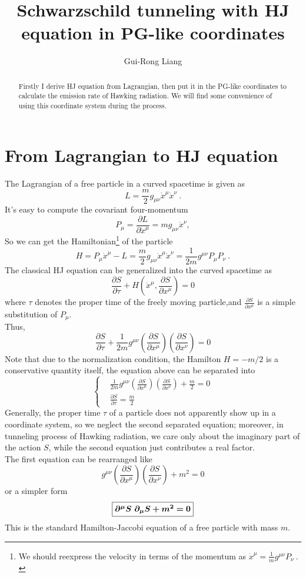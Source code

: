 \documentclass{article}
\newcommand{\be}{\begin{equation}}
\newcommand{\ee}{\end{equation}}
\begin{document}
\title{Schwarzschild tunneling with HJ equation in PG-like coordinates}
\author{Gui-Rong Liang}
\maketitle
\begin{abstract}
Firstly I derive HJ equation from Lagrangian, then put it in the PG-like coordinates to calculate the emission rate of Hawking radiation. We will find some convenience of using this coordinate system during the process.
\end{abstract}
\section{From Lagrangian to HJ equation}
The Lagrangian of a free particle in a curved spacetime is given as
\be
L=\frac m 2 g_{\mu\nu}\dot{x}^\mu\dot{x}^\nu ~.
\ee
It's easy to compute the covariant four-momentum
\be
P_\mu=\frac{\partial L}{\partial \dot x^\mu}=m g_{\mu\nu}\dot x^\nu,
\ee
\renewcommand{\thefootnote}{\fnsymbol{footnote}}
So we can get the Hamiltonian\footnote{We should reexpress the velocity in terms of the momentum as $\dot x^\mu=\frac 1 m g^{\mu\nu}P_\nu ~.$} of the particle
\be
H=P_\mu \dot x^\mu-L=\frac m 2 g_{\mu\nu}\dot x^\mu \dot x^\nu=\frac1{2m} g^{\mu\nu}P_\mu P_\nu ~.
\ee
The classical HJ equation can be generalized into the curved spacetime as
\be
\frac{\partial S}{\partial \tau}+H(\dot x^\mu,\frac{\partial S}{\partial x^\mu})=0
\ee
where $\tau$ denotes the proper time of the freely moving particle,and $\frac{\partial S}{\partial x^\mu}$ is a simple substitution of $P_\mu$.\\
Thus,
\be
\frac{\partial S}{\partial\tau}+\frac1{2m}g^{\mu\nu} (\frac{\partial S}{\partial x^\mu}) (\frac{\partial S} {\partial x^\nu})=0
\ee
Note that due to the normalization condition, the Hamilton $H=-m/2$ is a conservative quantity itself, the equation above can be separated into
\be
\left\{\begin{split}
&\frac 1 {2m} g^{\mu\nu} (\frac{\partial S}{\partial x^\mu}) (\frac{\partial S} {\partial x^\nu})+\frac m 2=0 \\
&\frac{\partial S}{\partial\tau}=\frac m 2
\end{split}\right.
\ee
Generally, the proper time $\tau$ of a particle does not apparently show up in a coordinate system, so we neglect the second separated equation; moreover, in tunneling process of Hawking radiation, we care only about the imaginary part of the action $S$, while the second equation just contributes a real factor.\\
The first equation can be rearranged like
\be
g^{\mu\nu} (\frac{\partial S}{\partial x^\mu}) (\frac{\partial S} {\partial x^\nu})+m^2=0
\label{hj}
\ee
or a simpler form
\be
\fbox{$\bm{\partial^\mu S~\partial_\mu S+m^2=0$}}
\ee
This is the standard Hamilton-Jaccobi equation of a free particle with mass $m$.
\end{document}
